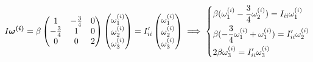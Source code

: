 \documentclass{article}
\begin{document}
        \begin{equation*}
            I \boldsymbol{\omega^{(i)}} = \beta
            \begin{pmatrix}
                1 & -\frac{3}{4}  & 0 \\
                -\frac{3}{4}  & 1 & 0 \\
                0 & 0 & 2  \\
            \end{pmatrix}
            \begin{pmatrix*}
                \omega^{(i)}_1 \\
                \omega^{(i)}_2 \\
                \omega^{(i)}_3 \\
            \end{pmatrix*}
            = 
            I'_{ii}
            \begin{pmatrix*}
                \omega^{(i)}_1 \\
                \omega^{(i)}_2 \\
                \omega^{(i)}_3 \\
            \end{pmatrix*}
        \implies
        \begin{dcases*}
            \beta (\omega^{(i)}_1 - \frac{3}{4} \omega^{(i)}_2) = I_{ii}\omega^{(i)}_1 \\
            \beta (- \frac{3}{4} \omega^{(i)}_1 + \omega^{(i)}_1) = I_{ii}'\omega^{(i)}_2 \\
            2 \beta \omega^{(i)}_3 = I_{ii}' \omega^{(i)}_3
        \end{dcases*}
        \end{equation*}
\end{document}

